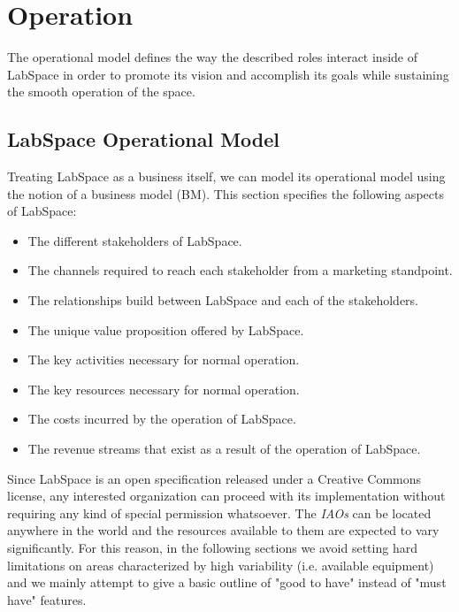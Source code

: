 \documentclass[a4paper, 11pt]{article}
\begin{document}


\section{Operation}

The operational model defines the way the described roles interact inside of LabSpace in order to promote its vision and accomplish its goals while sustaining the smooth operation of the space.

\subsection{LabSpace Operational Model}

Treating LabSpace as a business itself, we can model its operational model using the notion of a business model (BM). This section specifies the following aspects of LabSpace:

\begin{itemize}[noitemsep]
    \item The different stakeholders of LabSpace.
    \item The channels required to reach each stakeholder from a marketing standpoint.
    \item The relationships build between LabSpace and each of the stakeholders.
    \item The unique value proposition offered by LabSpace.
    \item The key activities necessary for normal operation.
    \item The key resources necessary for normal operation.
    \item The costs incurred by the operation of LabSpace.
    \item The revenue streams that exist as a result of the operation of LabSpace.
\end{itemize}

Since LabSpace is an open specification released under a Creative Commons license, any interested organization can proceed with its implementation without requiring any kind of special permission whatsoever. The \textit{IAOs} can be located anywhere in the world and the resources available to them are expected to vary significantly. For this reason, in the following sections we avoid setting hard limitations on areas characterized by high variability (i.e. available equipment) and we mainly attempt to give a basic outline of "good to have" instead of "must have" features.
\end{document}
